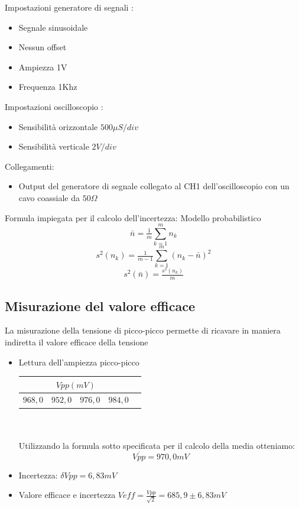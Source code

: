 \documentclass[a4paper]{article}
\begin{document}
Impostazioni generatore di segnali :
\begin{itemize}
\item Segnale sinusoidale
\item Nessun offset
\item Ampiezza 1V
\item Frequenza 1Khz
\end{itemize}

Impostazioni oscilloscopio :
\begin{itemize}
\item Sensibilità orizzontale \(500  \mu S/div \)
\item Sensibilità verticale \(2 V/div\)
\end{itemize}

Collegamenti:
\begin{itemize}
\item Output del generatore di segnale collegato al CH1 dell'oscilloscopio con un cavo coassiale da \(50 \Omega\)  
\end{itemize}

Formula impiegata per il calcolo dell’incertezza: Modello probabilistico \[\bar{n} = \tfrac{1}{m}\sum_{k=1}^m n_k \]
\[s^2 (n_k)= \tfrac{1}{m-1}\sum_{k=1}^m (n_k - \bar{n})^2 \] 
\[s^2 (\bar{n}) = \tfrac{s^2 (n_k)}{m}\]

\subsection{Misurazione del valore efficace}

La misurazione della tensione di picco-picco permette di ricavare in maniera indiretta il valore efficace della tensione
\begin{itemize}
\item Lettura dell’ampiezza picco-picco \\ 
    \begin{tabular}{|r|l|l|l|l|}
     \hline
     \multicolumn{4}{|c|}{\(Vpp (mV)\)} \\
     \hline
     \(968,0\) & \(952,0\) & \(976,0\) & \(984,0\) \\
     \hline
   \end{tabular} \\ \\
Utilizzando la formula sotto specificata per il calcolo della media otteniamo:
\[\overline{Vpp}= 970,0 mV\]
\item Incertezza: \(\delta{}  Vpp= 6,83 mV\)
\item Valore efficace e incertezza \(Veff= \tfrac{Vpp}{\sqrt{2}} = 685,9 \pm 6,83 mV \)
\end{itemize}
\end{document}

